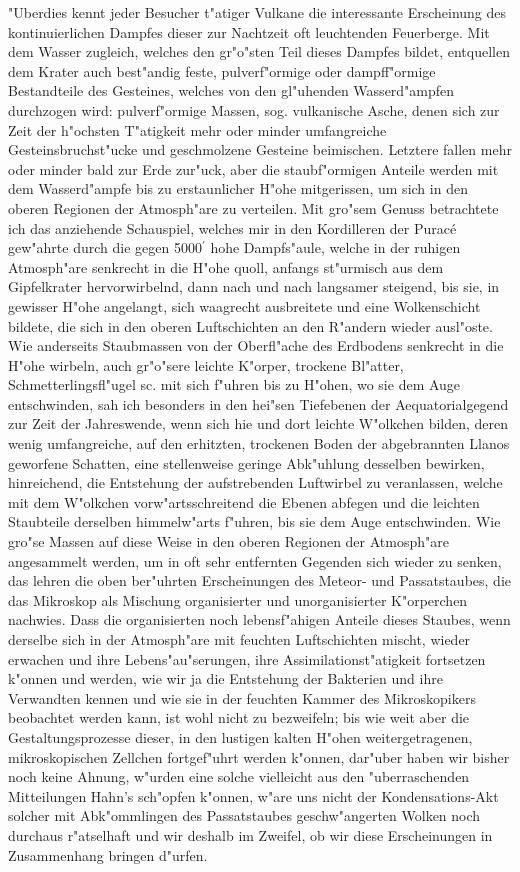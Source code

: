 \documentclass[a4paper, 11pt, oneside]{article}
\begin{document}
"Uberdies kennt jeder Besucher t"atiger Vulkane die interessante Erscheinung des kontinuierlichen Dampfes dieser zur Nachtzeit oft leuchtenden Feuerberge. Mit dem Wasser zugleich, welches den gr"o"sten Teil dieses Dampfes bildet, entquellen dem Krater auch best"andig feste, pulverf"ormige oder dampff"ormige Bestandteile des Gesteines, welches von den gl"uhenden Wasserd"ampfen durchzogen wird: pulverf"ormige Massen, sog. vulkanische Asche, denen sich zur Zeit der h"ochsten T"atigkeit mehr oder minder umfangreiche Gesteinsbruchst"ucke und geschmolzene Gesteine beimischen. Letztere fallen mehr oder minder bald zur Erde zur"uck, aber die staubf"ormigen Anteile werden mit dem Wasserd"ampfe bis zu erstaunlicher H"ohe mitgerissen, um sich in den oberen Regionen der Atmosph"are zu verteilen. Mit gro"sem Genuss betrachtete ich das anziehende Schauspiel, welches mir in den Kordilleren der Puracé gew"ahrte durch die gegen 5000$^{\prime}$ hohe Dampfs"aule, welche in der ruhigen Atmosph"are senkrecht in die H"ohe quoll, anfangs st"urmisch aus dem Gipfelkrater hervorwirbelnd, dann nach und nach langsamer steigend, bis sie, in gewisser H"ohe angelangt, sich waagrecht ausbreitete und eine Wolkenschicht bildete, die sich in den oberen Luftschichten an den R"andern wieder ausl"oste. Wie anderseits Staubmassen von der Oberfl"ache des Erdbodens senkrecht in die H"ohe wirbeln, auch gr"o"sere leichte K"orper, trockene Bl"atter, Schmetterlingsfl"ugel sc. mit sich f"uhren bis zu H"ohen, wo sie dem Auge entschwinden, sah ich besonders in den hei"sen Tiefebenen der Aequatorialgegend zur Zeit der Jahreswende, wenn sich hie und dort leichte W"olkchen bilden, deren wenig umfangreiche, auf den erhitzten, trockenen Boden der abgebrannten Llanos geworfene Schatten, eine stellenweise geringe Abk"uhlung desselben bewirken, hinreichend, die Entstehung der aufstrebenden Luftwirbel zu veranlassen, welche mit dem W"olkchen vorw"artsschreitend die Ebenen abfegen und die leichten Staubteile derselben himmelw"arts f"uhren, bis sie dem Auge entschwinden. Wie gro"se Massen auf diese Weise in den oberen Regionen der Atmosph"are angesammelt werden, um in oft sehr entfernten Gegenden sich wieder zu senken, das lehren die oben ber"uhrten Erscheinungen des Meteor- und Passatstaubes, die das Mikroskop als Mischung organisierter und unorganisierter K"orperchen nachwies. Dass die organisierten noch lebensf"ahigen Anteile dieses Staubes, wenn derselbe sich in der Atmosph"are mit feuchten Luftschichten mischt, wieder erwachen und ihre Lebens"au"serungen, ihre Assimilationst"atigkeit fortsetzen k"onnen und werden, wie wir ja die Entstehung der Bakterien und ihre Verwandten kennen und wie sie in der feuchten Kammer des Mikroskopikers beobachtet werden kann, ist wohl nicht zu bezweifeln; bis wie weit aber die Gestaltungsprozesse dieser, in den lustigen kalten H"ohen weitergetragenen, mikroskopischen Zellchen fortgef"uhrt werden k"onnen, dar"uber haben wir bisher noch keine Ahnung, w"urden eine solche vielleicht aus den "uberraschenden Mitteilungen Hahn's sch"opfen k"onnen, w"are uns nicht der Kondensations-Akt solcher mit Abk"ommlingen des Passatstaubes geschw"angerten Wolken noch durchaus r"atselhaft und wir deshalb im Zweifel, ob wir diese Erscheinungen in Zusammenhang bringen d"urfen.
\end{document}
